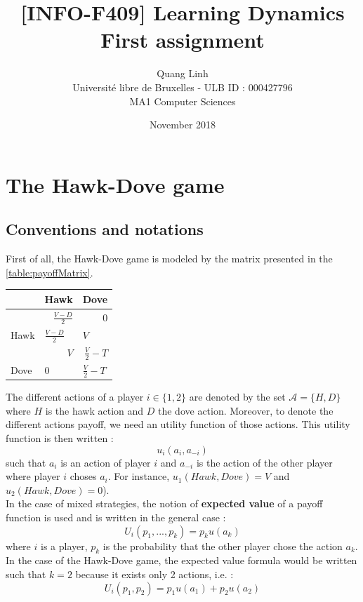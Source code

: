 \documentclass{article}
\title{[INFO-F409] Learning Dynamics \\ First assignment}
\author{\bsc{BUI QUANG PHUONG} Quang Linh \\ Université libre de Bruxelles - ULB ID : 000427796  \\ MA1 Computer Sciences}
\date{November 2018}
\begin{document}
\maketitle

\section{The Hawk-Dove game}

\subsection*{Conventions and notations}
First of all, the Hawk-Dove game is modeled by the matrix presented in the \autoref{table:payoffMatrix}. 

\begin{center}
\begin{tabular}{|l|r|r|}
  \hline
  			   & Hawk & Dove \\
  \hline
  		   & \hspace{1cm} $\frac{V-D}{2}$ & 0 \\
  	Hawk &	\multicolumn{1}{|l|}{$\frac{V-D}{2}$}		& 	\multicolumn{1}{|l|}{$V$ }		\\
  \hline
    		   & \multicolumn{1}{|r|}{$V$} & \hspace{1cm} $\frac{V}{2}-T$  \\
  Dove &	\multicolumn{1}{|l|}{0}		& 	\multicolumn{1}{|l|}{$\frac{V}{2}-T$}		\\
  \hline
\end{tabular}
\label{table:payoffMatrix}
\end{center}

The different actions of a player $i \in \{1,2\}$ are denoted by the set $\mathcal{A} = \{H,D\}$ where $H$ is the hawk action and  
$D$ the dove action. Moreover, to denote the different actions payoff, we need an utility function of those actions. This utility function is then written  : 
$$ u_{i}(a_{i}, a_{-i}) $$ such that $a_{i}$ is an action of player $i$ and $a_{-i}$ is the action of the other player where player $i$ choses $a_{i}$. For instance,  $ u_{1}(Hawk, Dove) = V $ and $ u_{2}(Hawk, Dove) = 0 $). \\

In the case of mixed strategies, the notion of \textbf{expected value} of a payoff function is used and is written in the general case :
$$ U_{i}(p_{1}, ... , p_{k }) = p_{k} u(a_{k})$$ where $i$ is a player, $p_{k}$ is the probability that the other player chose the action $a_{k}$. 
In the case of the Hawk-Dove game, the expected value formula would be written such that $k=2$ because it exists only 2 actions, i.e. :  $$ U_{i}(p_{1}, p_{2}) = p_{1} u(a_{1}) + p_{2} u(a_{2})$$
\end{document}
